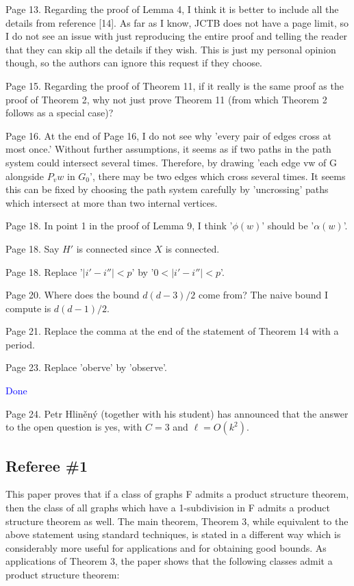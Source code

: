 \documentclass[12pt]{article}
\begin{document}
		Page 13.  Regarding the proof of Lemma 4, I think it is better to
		include all the details from reference [14].  As far as I know, JCTB
		does not have a page limit, so I do not see an issue with just
		reproducing the entire proof and telling the reader that they can skip
		all the details if they wish.  This is just my personal opinion
		though, so the authors can ignore this request if they choose.
		
		Page 15. Regarding the proof of Theorem 11, if it really is the same
		proof as the proof of Theorem 2, why not just prove Theorem 11 (from
		which Theorem 2 follows as a special case)?
		
		Page 16.  At the end of Page 16, I do not see why 'every pair of edges
		cross at most once.'  Without further assumptions, it seems as if two
		paths in the path system could intersect several times.  Therefore, by
		drawing 'each edge vw of G alongside $P_vw$ in $G_0$', there may be two
		edges which cross several times.  It seems this can be fixed by
		choosing the path system carefully by 'uncrossing' paths which
		intersect at more than two internal vertices.
		
		Page 18. In point 1 in the proof of Lemma 9, I think '$\phi(w)$' should
		be '$\alpha(w)$'.
		
		Page 18.  Say $H'$ is connected since $X$ is connected.
		
		Page 18.  Replace '$|i'-i''| < p$' by  '$0< |i'-i''| < p$'.
		
		Page 20.  Where does the bound $d(d-3)/2$ come from?  The naive bound I
		compute is $d(d-1)/2$.
		
		Page 21.  Replace the comma at the end of the statement of Theorem 14
		with a period.
		
		Page 23. Replace 'oberve' by 'observe'.
		
		\textcolor{blue}{Done}
		
		Page 24. Petr Hliněný (together with his student) has announced that
		the answer to the open question is yes, with $C=3$ and $\ell=O(k^2)$.
		
\subsection*{Referee \#1}

This paper proves that if a class of graphs F admits a product structure
theorem, then the class of all graphs which have a 1-subdivision in F admits
a product structure theorem as well. The main theorem, Theorem 3, while
equivalent to the above statement using standard techniques, is stated in
a different way which is considerably more useful for applications and for
obtaining good bounds. As applications of Theorem 3, the paper shows that
the following classes admit a product structure theorem:
\end{document}
